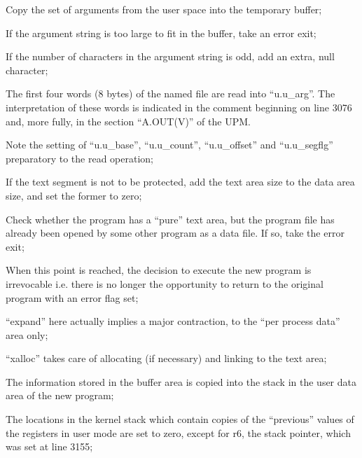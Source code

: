 \item[3052:] Copy the set of arguments from
 the user space into the temporary
 buffer;

\item[3064:] If the argument string is too
large to fit in the buffer, take
an error exit;

\item[3071:] If the number of characters in
the argument string is odd, add
an extra, null character;

\item[3090:] The first four words (8 bytes) of
 the named file are read into
 ``u.u\_arg''. The interpretation of
 these words is indicated in the
 comment beginning on line 3076
 and, more fully, in the section
 ``A.OUT(V)'' of the UPM.

Note the setting of ``u.u\_base'',
``u.u\_count'', ``u.u\_offset'' and
``u.u\_segflg'' preparatory to the
read operation;

\item[3095:] If the text segment is not to be
protected, add the text area size
to the data area size, and set the former to
zero;

\item[3105:] Check whether the program has a
``pure'' text area, but the program
file has already been opened by
some other program as a data
file. If so, take the error exit;

\item[3127:] When this point is reached, the
 decision to execute the new program is irrevocable i.e. there is
 no longer the opportunity to
 return to the original program
 with an error flag set;

\item[3129:] ``expand'' here actually implies a
major contraction, to the ``per
process data'' area only;

\item[3130:] ``xalloc'' takes care of allocating
(if necessary) and linking to the
text area;

\item[3158:] The information stored in the
 buffer area is copied into the
 stack in the user data area of
 the new program;

\item[3186:] The locations in the kernel stack
which contain copies of the ``previous'' values of the registers in
user mode are set to zero, except
for r6, the stack pointer, which
was set at line 3155;

